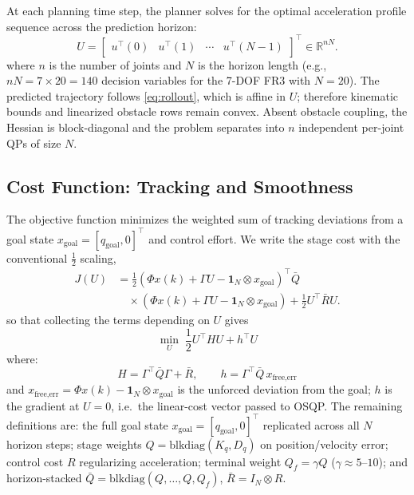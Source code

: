 At each planning time step, the planner solves for the optimal
acceleration profile sequence across the prediction horizon:
\begin{equation}
\label{eq:decision-vector}
U = \begin{bmatrix} u^\top(0) & u^\top(1) & \cdots & u^\top(N-1) \end{bmatrix}^\top
\in \mathbb{R}^{nN}.
\end{equation}
where \(n\) is the number of joints and \(N\) is the horizon length
(e.g., \(nN = 7\times 20 = 140\) decision variables for the 7-DOF FR3
with \(N=20\)). The predicted trajectory follows \eqref{eq:rollout},
which is affine in \(U\); therefore kinematic bounds and linearized
obstacle rows remain convex. Absent obstacle coupling, the Hessian is
block-diagonal and the problem separates into \(n\) independent
per-joint QPs of size \(N\).

\subsection{Cost Function: Tracking and
Smoothness}\label{b.-cost-function-tracking-and-smoothness}

The objective function minimizes the weighted sum of tracking deviations
from a goal state \(x_{\text{goal}} = [q_{\text{goal}}, 0]^\top\) and
control effort. We write the stage cost with the conventional
\(\tfrac{1}{2}\) scaling,
\begin{align}
\label{eq:tracking-cost}
J(U)
&=\frac{1}{2}
\left(\Phi x(k)+\Gamma U-\mathbf{1}_N\otimes x_{\text{goal}}\right)^\top
\bar Q \nonumber\\
&\quad \times
\left(\Phi x(k)+\Gamma U-\mathbf{1}_N\otimes x_{\text{goal}}\right)
+\frac{1}{2}U^\top\bar R U .
\end{align}
so that collecting the terms depending on \(U\) gives
\begin{equation}
\label{eq:qp-objective}
\min_{U} \; \frac{1}{2} U^\top H U + h^\top U
\end{equation}
where:
\begin{equation}
\label{eq:qp-hessian-gradient}
H = \Gamma^\top \bar{Q} \Gamma + \bar{R}, \qquad
h = \Gamma^\top \bar{Q} \, x_{\text{free,err}}
\end{equation}
and
\(x_{\text{free,err}} = \Phi x(k) - \mathbf{1}_N \otimes x_{\text{goal}}\)
is the unforced deviation from the goal; \(h\) is the gradient at \(U=0\),
i.e.\ the linear-cost vector passed to OSQP. The remaining definitions
are: the full goal state \(x_{\text{goal}}=[q_{\text{goal}},0]^\top\)
replicated across all \(N\) horizon steps; stage weights
\(Q = \text{blkdiag}(K_q, D_q)\) on position/velocity error; control cost
\(R\) regularizing acceleration; terminal weight \(Q_f = \gamma Q\)
(\(\gamma \approx 5\)--\(10\)); and horizon-stacked
\(\bar Q = \mathrm{blkdiag}(Q,\dots,Q,Q_f)\), \(\bar R = I_N \otimes R\).

